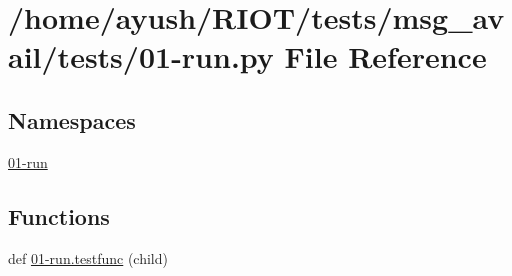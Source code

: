 \hypertarget{msg__avail_2tests_201-run_8py}{}\section{/home/ayush/\+R\+I\+O\+T/tests/msg\+\_\+avail/tests/01-\/run.py File Reference}
\label{msg__avail_2tests_201-run_8py}
\subsection*{Namespaces}
\begin{DoxyCompactItemize}
\item 
 \hyperlink{namespace01-run}{01-\/run}
\end{DoxyCompactItemize}
\subsection*{Functions}
\begin{DoxyCompactItemize}
\item 
def \hyperlink{namespace01-run_aff983ffd4ab0e6bf8e7e58970e4a10bb}{01-\/run.\+testfunc} (child)
\end{DoxyCompactItemize}
